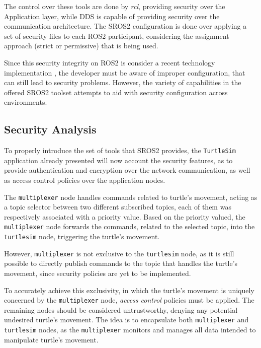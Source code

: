 The control over these tools are done by \textit{rcl}, providing security over the Application layer, while DDS is capable of providing security over the communication architecture. The SROS2 configuration is done over applying a set of security files to each ROS2 participant, considering the assignment approach (strict or permissive) that is being used.

Since this security integrity on ROS2 is consider a recent technology implementation \cite{ros-dds-integration}, the developer must be aware of improper configuration, that can still lead to security problems. However, the variety of capabilities in the offered SROS2 toolset attempts to aid with security configuration across environments. 

\subsection{Security Analysis}

To properly introduce the set of tools that SROS2 provides, the \texttt{TurtleSim} application already presented will now account the security features, as to provide authentication and encryption over the network communication, as well as access control policies over the application nodes. 
            
The \texttt{multiplexer} node handles commands related to turtle's movement, acting as a topic selector between two different subscribed topics, each of them was respectively associated with a priority value. Based on the priority valued, the \texttt{multiplexer} node forwards the commands, related to the selected topic, into the \texttt{turtlesim} node, triggering the turtle's movement. 

However, \texttt{multiplexer} is not exclusive to the \texttt{turtlesim} node, as it is still possible to directly publish commands to the topic that handles the turtle's movement, since security policies are yet to be implemented.

To accurately achieve this exclusivity, in which the turtle's movement is uniquely concerned by the \texttt{multiplexer} node, \textit{access control} policies must be applied. The remaining nodes should be considered untrustworthy, denying any potential undesired turtle's movement. The idea is to encapsulate both \texttt{multiplexer} and \texttt{turtlesim} nodes, as the \texttt{multiplexer} monitors and manages all data intended to manipulate turtle's movement.


